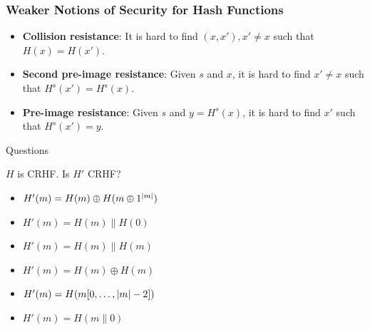 \begin{frame}\frametitle{Weaker Notions of Security for Hash Functions}
\begin{figure}
\begin{center}

\end{center}
\end{figure}
\begin{itemize}
\item \textbf{Collision resistance}: It is hard to find $(x, x'), x' \ne x$ such that $H(x) = H(x')$.
\item \textbf{Second pre-image resistance}: Given $s$ and $x$, it is hard to find $x' \ne x$ such that $H^s(x') = H^s(x)$.
\item \textbf{Pre-image resistance}: Given $s$ and $y = H^s(x)$, it is hard to find $x'$ such that $H^s(x')=y$.
\end{itemize}
\end{frame}
\begin{frame}{Questions}
\begin{exampleblock}{$H$ is CRHF. Is $H'$ CRHF?}
\begin{itemize}
\item $H'(m) = H(m)\oplus H(m\oplus 1^{\lvert m\rvert})$ %
\item $H'(m) = H(m)\| H(0)$
\item $H'(m) = H(m)\| H(m)$
\item $H'(m) = H(m) \oplus H(m)$
\item $H'(m) = H(m[0,\dots,\lvert m\rvert-2])$
\item $H'(m) = H(m\| 0)$
\end{itemize}
\end{exampleblock}
\end{frame}
